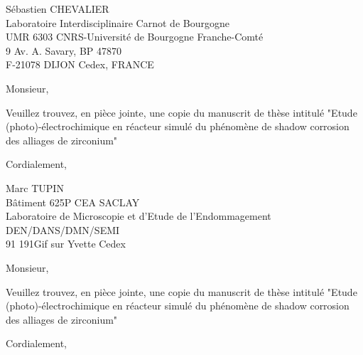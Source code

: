 \documentclass{lettre}
\begin{document}
\begin{letter}{Sébastien CHEVALIER \\
Laboratoire Interdisciplinaire Carnot de Bourgogne\\
UMR 6303 CNRS-Université de Bourgogne Franche-Comté\\
9 Av. A. Savary, BP 47870\\
F-21078 DIJON Cedex, FRANCE\\
}

\address{Milan Skocic\\40 Rue des Lamineurs\\ 71200 Le Creusot}
\fax{}
\signature{Milan Skocic}


\opening{Monsieur,}

Veuillez trouvez, en pièce jointe, une copie du manuscrit de thèse intitulé "Etude (photo)-électrochimique en réacteur simulé du phénomène de shadow corrosion des alliages de zirconium"

\closing{Cordialement,}


\end{letter}



\begin{letter}{Marc TUPIN\\
Bâtiment 625P CEA SACLAY \\
Laboratoire de Microscopie et d'Etude de l'Endommagement\\
DEN/DANS/DMN/SEMI\\
91 191Gif sur Yvette Cedex}

\address{Milan Skocic\\40 Rue des Lamineurs\\ 71200 Le Creusot}
\fax{}
\signature{Milan Skocic}


\opening{Monsieur,}

Veuillez trouvez, en pièce jointe, une copie du manuscrit de thèse intitulé "Etude (photo)-électrochimique en réacteur simulé du phénomène de shadow corrosion des alliages de zirconium"

\closing{Cordialement,}


\end{letter}
\end{document}
